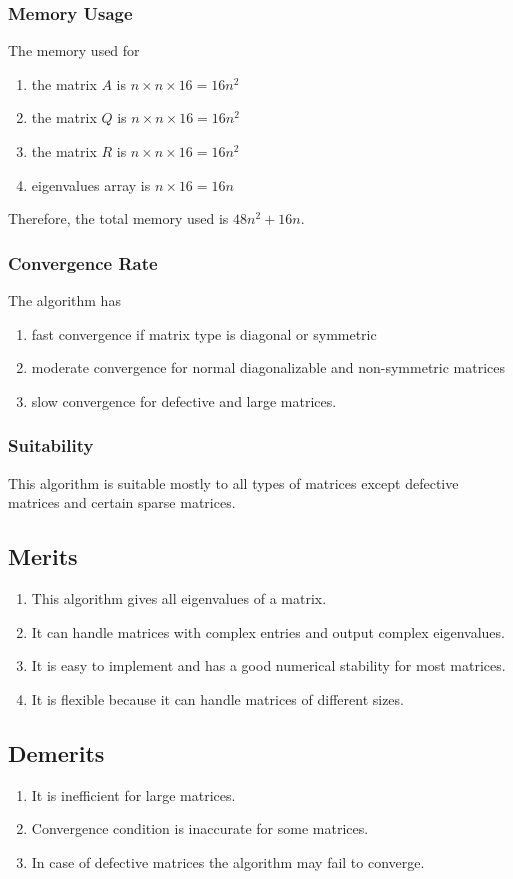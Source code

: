 \documentclass[12pt,a4paper]{article}
\begin{document}
\subsubsection{Memory Usage}
The memory used for 
\begin{enumerate}
    \item the matrix $A$ is $n\times n\times 16 = 16n^2$ 
    \item the matrix $Q$ is $n\times n\times 16 = 16n^2$ 
     \item the matrix $R$ is $n\times n\times 16 = 16n^2$ 
     \item eigenvalues array is $n\times 16 = 16n$
\end{enumerate}
Therefore, the total memory used is $48n^2 + 16n$.
\subsubsection{Convergence Rate}
The algorithm has
\begin{enumerate}
    \item fast convergence if matrix type is diagonal or symmetric
    \item moderate convergence for normal diagonalizable and non-symmetric matrices
    \item slow convergence for defective and large matrices.
\end{enumerate}
\subsubsection{Suitability}
This algorithm is suitable mostly to all types of matrices except defective matrices and certain sparse matrices.
\subsection{Merits}
\begin{enumerate}
    \item This algorithm gives all eigenvalues of a matrix.
    \item It can handle matrices with complex entries and output complex eigenvalues.
    \item It is easy to implement and has a good numerical stability for most matrices.
    \item It is flexible because it can handle matrices of different sizes.
\end{enumerate}
\subsection{Demerits}
\begin{enumerate}
    \item It is inefficient for large matrices.
    \item Convergence condition is inaccurate for some matrices.
    \item In case of defective matrices the algorithm may fail to converge.
\end{enumerate}
\end{document}
